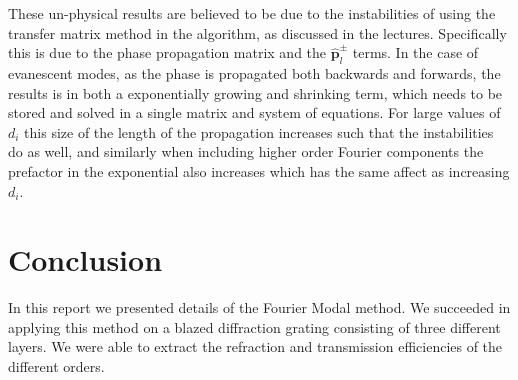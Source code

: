 \documentclass[a4paper,12pt]{scrartcl}
\begin{document}
These un-physical results are believed to be due to the instabilities of using the transfer matrix method in the algorithm, as discussed in the lectures. Specifically this is due to the phase propagation matrix and the $\boldsymbol{\hat{p}}_{l}^{\pm}$ terms. In the case of evanescent modes, as the phase is propagated both backwards and forwards, the results is in both a exponentially growing and shrinking term, which needs to be stored and solved in a single matrix and system of equations. For large values of $d_i$ this size of the length of the propagation increases such that the instabilities do as well, and similarly when including higher order Fourier components the prefactor in the exponential also increases which has the same affect as increasing $d_i$.

\section{Conclusion}
    In this report we presented details of the Fourier Modal method.
    We succeeded in applying this method on a blazed diffraction grating consisting of three different layers. We were able to extract the refraction and transmission efficiencies of the different orders.

\newpage
\nocite{*}
\printbibliography
\end{document}
